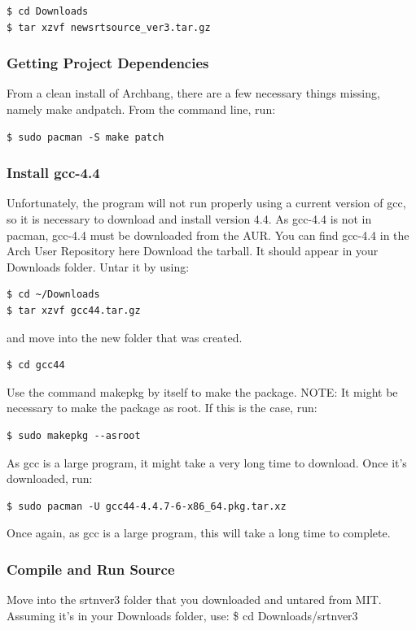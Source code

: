 \documentclass[11pt]{article} %
\begin{document}
\begin{verbatim}
$ cd Downloads
$ tar xzvf newsrtsource_ver3.tar.gz
\end{verbatim}

\subsubsection{Getting Project Dependencies}
From a clean install of Archbang, there are a few necessary things missing, namely make andpatch.
From the command line, run:

\begin{verbatim}
$ sudo pacman -S make patch
\end{verbatim}

\subsubsection{Install gcc-4.4}
Unfortunately, the program will not run properly using a current version of gcc, so it is necessary to download and install version 4.4. As gcc-4.4 is not in pacman, gcc-4.4 must be downloaded from the AUR.
You can find gcc-4.4 in the Arch User Repository here
Download the tarball. It should appear in your Downloads folder. Untar it by using:

\begin{verbatim}
$ cd ~/Downloads
$ tar xzvf gcc44.tar.gz
\end{verbatim}

and move into the new folder that was created.

\begin{verbatim}
$ cd gcc44
\end{verbatim}

Use the command makepkg by itself to make the package. NOTE: It might be necessary to make the package as root. If this is the case, run:

\begin{verbatim}
$ sudo makepkg --asroot
\end{verbatim}

As gcc is a large program, it might take a very long time to download. Once it's downloaded, run:

\begin{verbatim}
$ sudo pacman -U gcc44-4.4.7-6-x86_64.pkg.tar.xz
\end{verbatim}

Once again, as gcc is a large program, this will take a long time to complete.

\subsubsection{Compile and Run Source}
Move into the srtnver3 folder that you downloaded and untared from MIT. Assuming it's in your Downloads folder, use:
\$ cd Downloads/srtnver3
\end{document}
